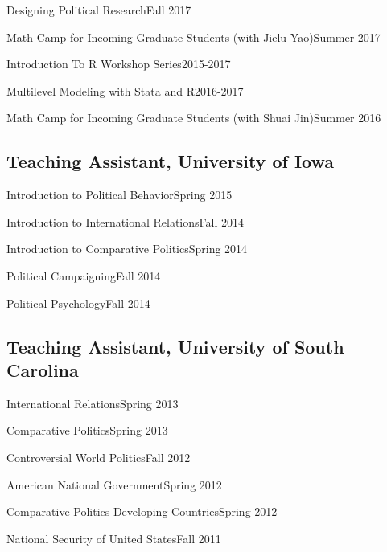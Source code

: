 \documentclass[10.5pt,]{article}
\providecommand{\tightlist}{%
	\setlength{\itemsep}{0pt}\setlength{\parskip}{0pt}}
\renewenvironment{itemize}{
	\begin{list}{}{
			\setlength{\leftmargin}{1.5em}
		}
	}{
	\end{list}
}
\begin{document}
\begin{itemize}
\tightlist
\item
  Designing Political Research\hfill Fall 2017
\item
  Math Camp for Incoming Graduate Students (with Jielu Yao)\hfill Summer
  2017
\item
  Introduction To R Workshop Series\hfill 2015-2017
\item
  Multilevel Modeling with Stata and R\hfill 2016-2017
\item
  Math Camp for Incoming Graduate Students (with Shuai Jin)\hfill Summer
  2016
\end{itemize}

\subsection{Teaching Assistant, University of
Iowa}\label{teaching-assistant-university-of-iowa}

\begin{itemize}
\tightlist
\item
  Introduction to Political Behavior\hfill Spring 2015
\item
  Introduction to International Relations\hfill Fall 2014
\item
  Introduction to Comparative Politics\hfill Spring 2014
\item
  Political Campaigning\hfill Fall 2014
\item
  Political Psychology\hfill Fall 2014
\end{itemize}

\subsection{Teaching Assistant, University of South
Carolina}\label{teaching-assistant-university-of-south-carolina}

\begin{itemize}
\tightlist
\item
  International Relations\hfill Spring 2013
\item
  Comparative Politics\hfill Spring 2013
\item
  Controversial World Politics\hfill Fall 2012
\item
  American National Government\hfill Spring 2012
\item
  Comparative Politics-Developing Countries\hfill Spring 2012
\item
  National Security of United States\hfill Fall 2011
\end{itemize}
\end{document}
